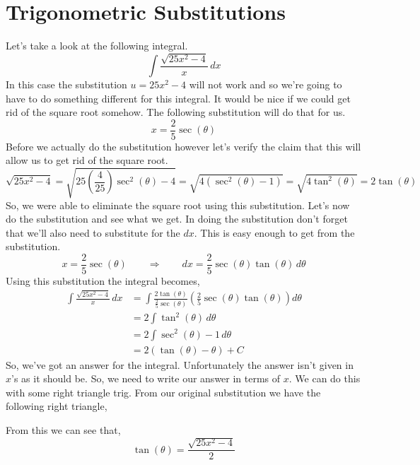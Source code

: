 \documentclass[10pt,reqno]{book}
\theoremstyle{definition}
\begin{document}
	\section{Trigonometric Substitutions}
	
	Let's take a look at the following integral.
	\[ \int \frac{\sqrt{25x^2 - 4}}{x}\,dx \]
	In this case the substitution $ u = 25x^2-4 $ will not work and so we're going to have to do something different for this integral. It would be nice if we could get rid of the square root somehow. The following substitution will do that for us.
	\[ x = \frac{2}{5}\sec(\theta) \]
	Before we actually do the substitution however let's verify the claim that this will allow us to get rid of the square root.
	\[ \sqrt{25x^2-4} = \sqrt{25\left(\dfrac{4}{25}\right)\sec^2(\theta)-4} = \sqrt{4(\sec^2(\theta)-1)} = \sqrt{4\tan^2(\theta)} = 2\tan(\theta) \]
	So, we were able to eliminate the square root using this substitution. Let's now do the substitution and see what we get. In doing the substitution don't forget that we'll also need to substitute for the $ dx $. This is easy enough to get from the substitution.
	\[ x = \frac{2}{5}\sec(\theta) \qquad \Rightarrow \qquad dx = \frac{2}{5}\sec(\theta)\tan(\theta)\,d\theta \]
	Using this substitution the integral becomes,
	\begin{align*}
		\int \frac{\sqrt{25x^2 - 4}}{x}\,dx &= \int \frac{2\tan(\theta)}{\frac{2}{5}\sec(\theta)}\left(\frac{2}{5}\sec(\theta)\tan(\theta)\right) d\theta\\
		&= 2 \int \tan^2(\theta)\,d\theta\\
		&= 2\int \sec^2(\theta) - 1\,d\theta\\
		&= 2(\tan(\theta) - \theta) +C
	\end{align*}
	So, we've got an answer for the integral. Unfortunately the answer isn't given in $ x $'s as it should be. So, we need to write our answer in terms of $ x $. We can do this with some right triangle trig. From our original substitution we have the following right triangle,
	\begin{center}
	\end{center}
	From this we can see that,
	\[ \tan(\theta) = \frac{\sqrt{25x^2-4}}{2} \]
\end{document}
